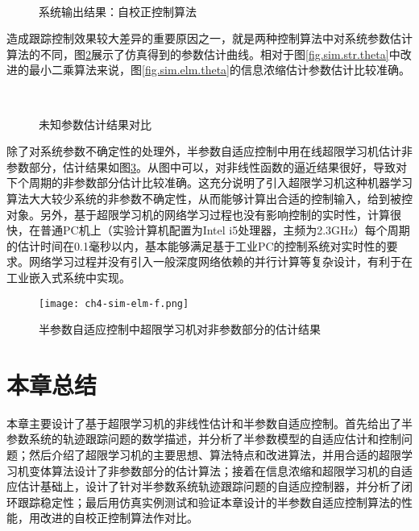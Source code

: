 \begin{figure}[!htb]
	\centering
	\\
	\caption{系统输出结果：自校正控制算法}
	\label{fig.sim.str.sys}
\end{figure}

造成跟踪控制效果较大差异的重要原因之一，就是两种控制算法中对系统参数估计算法的不同，图\ref{fig.sim.str.sys}展示了仿真得到的参数估计曲线。相对于图\ref{fig.sim.str.theta}中改进的最小二乘算法来说，图\ref{fig.sim.elm.theta}的信息浓缩估计参数估计比较准确。
\begin{figure}[!htb]
	\centering
	\\
	\caption{未知参数估计结果对比}
	\label{fig.sim.str.sys}
\end{figure}

除了对系统参数不确定性的处理外，半参数自适应控制中用在线超限学习机估计非参数部分，估计结果如图\ref{fig.sim.elm.f}。从图中可以，对非线性函数的逼近结果很好，导致对下个周期的非参数部分估计比较准确。这充分说明了引入超限学习机这种机器学习算法大大较少系统的非参数不确定性，从而能够计算出合适的控制输入，给到被控对象。另外，基于超限学习机的网络学习过程也没有影响控制的实时性，计算很快，在普通PC机上（实验计算机配置为Intel i5处理器，主频为2.3GHz）每个周期的估计时间在0.1毫秒以内，基本能够满足基于工业PC的控制系统对实时性的要求。网络学习过程并没有引入一般深度网络依赖的并行计算等复杂设计，有利于在工业嵌入式系统中实现。
\begin{figure}[!htb]
  \centering
  \texttt{[image: ch4-sim-elm-f.png]}\\
  \caption{半参数自适应控制中超限学习机对非参数部分的估计结果}
  \label{fig.sim.elm.f}
\end{figure}

\section{本章总结}\label{sect:4.5}
本章主要设计了基于超限学习机的非线性估计和半参数自适应控制。首先给出了半参数系统的轨迹跟踪问题的数学描述，并分析了半参数模型的自适应估计和控制问题；然后介绍了超限学习机的主要思想、算法特点和改进算法，并用合适的超限学习机变体算法设计了非参数部分的估计算法；接着在信息浓缩和超限学习机的自适应估计基础上，设计了针对半参数系统轨迹跟踪问题的自适应控制器，并分析了闭环跟踪稳定性；最后用仿真实例测试和验证本章设计的半参数自适应控制算法的性能，用改进的自校正控制算法作对比。